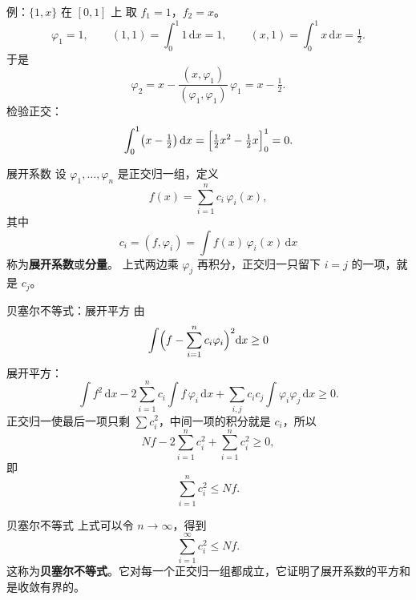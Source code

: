 \documentclass[fontset=windows, chinese, 10pt, xcolor=dvipsnames]{beamer}
\begin{document}
\begin{frame}{例：$\{1,x\}$ 在 $[0,1]$ 上}
  取 $f_1=1$，$f_2=x$。
  \begin{equation*}
    \varphi_1=1,
    \qquad
    (1,1)=\int_0^1 1\,\mathrm{d}x=1,
    \qquad
    (x,1)=\int_0^1 x\,\mathrm{d}x=\tfrac12.
  \end{equation*}
  于是
  \begin{equation*}
    \varphi_2=x-\frac{(x,\varphi_1)}{(\varphi_1,\varphi_1)}\,\varphi_1
            =x-\tfrac12.
  \end{equation*}
  检验正交：
  \begin{equation*}
    \int_0^1\bigl(x-\tfrac12\bigr)\,\mathrm{d}x
    =\Bigl[\tfrac12 x^2-\tfrac12 x\Bigr]_0^1=0.
  \end{equation*}
\end{frame}

\begin{frame}{展开系数}
  设 $\varphi_1,\ldots,\varphi_n$ 是正交归一组，定义
  \begin{equation*}
    f(x)=\sum_{i=1}^n c_i\,\varphi_i(x),
  \end{equation*}
  其中
  \begin{equation*}
    c_i=(f,\varphi_i)=\int f(x)\,\varphi_i(x)\,\mathrm{d}x
  \end{equation*}
  称为\textbf{展开系数}或\textbf{分量}。
  上式两边乘 $\varphi_j$ 再积分，正交归一只留下 $i=j$ 的一项，就是 $c_j$。
\end{frame}

\begin{frame}{贝塞尔不等式：展开平方}
  由
  \begin{equation*}
    \int\Bigl(f-\sum_{i=1}^n c_i\varphi_i\Bigr)^2\mathrm{d}x\geq 0
  \end{equation*}
  展开平方：
  \begin{equation*}
    \int f^2\,\mathrm{d}x
    -2\sum_{i=1}^n c_i\int f\,\varphi_i\,\mathrm{d}x
    +\sum_{i,j} c_i c_j\int \varphi_i\varphi_j\,\mathrm{d}x\geq 0.
  \end{equation*}
  正交归一使最后一项只剩 $\sum c_i^2$，中间一项的积分就是 $c_i$，所以
  \begin{equation*}
    Nf-2\sum_{i=1}^n c_i^2+\sum_{i=1}^n c_i^2\geq 0,
  \end{equation*}
  即
  \begin{equation*}
    \sum_{i=1}^n c_i^2\leq Nf.
  \end{equation*}
\end{frame}

\begin{frame}{贝塞尔不等式}
  上式可以令 $n\to\infty$，得到
  \begin{equation*}
    \sum_{i=1}^{\infty} c_i^2\leq Nf.
  \end{equation*}
  这称为\textbf{贝塞尔不等式}。它对每一个正交归一组都成立，它证明了展开系数的平方和是收敛有界的。
\end{frame}
\end{document}
